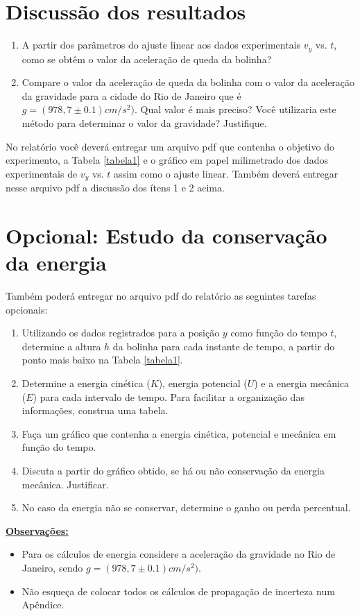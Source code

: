 \documentclass[12pt]{article}
\begin{document}
\clearpage

\section{Discussão dos resultados}

\begin{enumerate}
\item A partir dos parâmetros do ajuste linear aos dados experimentais $v_y$ vs. $t$, 
como se obtêm o valor da aceleração de queda da bolinha?
\item 
Compare o valor da aceleração de queda da bolinha com o valor da aceleração da gravidade 
para a cidade do Rio de Janeiro que é $g=(978,7\pm 0.1) cm/s^2)$. 
Qual valor é mais preciso? Você utilizaria este método para determinar o valor da gravidade? Justifique.
\end{enumerate}
\par 
No relatório você deverá entregar um arquivo pdf que
contenha o objetivo do experimento, a Tabela \ref{tabela1} e o gráfico em papel milimetrado dos dados experimentais de $v_y$ vs. $t$ assim como o ajuste linear. Também deverá entregar nesse arquivo pdf  a discussão dos ítens 1 e 2 acima. 

\section{Opcional: Estudo da conservação da energia}
\indent

Também poderá entregar no arquivo pdf do relatório as seguintes tarefas opcionais:

\begin{enumerate}
\item Utilizando os dados registrados para a posição $y$ como função do tempo $t$, determine a altura $h$ da bolinha para cada instante de tempo, a partir do ponto mais baixo na Tabela \ref{tabela1}.
\item Determine a energia cinética ($K$), energia potencial ($U$) e a energia mecânica ($E$) para cada intervalo de tempo. Para facilitar a organização das informações, construa uma tabela.
\item Faça um gráfico que contenha a energia cinética, potencial e mecânica em função do tempo.
\item Discuta a partir do gráfico obtido, se há ou não conservação da energia mecânica. Justificar.
\item No caso da energia não se conservar, determine o ganho ou perda percentual.
\end{enumerate}
\underline{\bf Observações:}
\\
\begin{itemize}
\item Para os cálculos de energia considere a aceleração da gravidade no Rio de Janeiro, 
sendo $g=(978,7\pm 0.1) cm/s^2)$.
\item Não esqueça de colocar todos os cálculos de propagação de incerteza num Apêndice.
\end{itemize}
\end{document}
